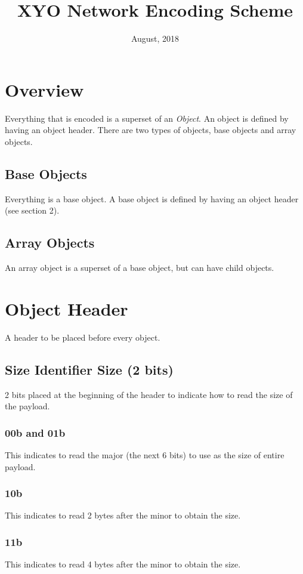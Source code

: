 \documentclass[11pt]{article}
\title{XYO Network Encoding Scheme}
\date{August, 2018}
\begin{document}
\maketitle


\section{Overview}
Everything that is encoded is a superset of an \textit{Object}. An object is defined by having an object header. There are two types of objects, base objects and array objects.

\subsection{Base Objects}
Everything is a base object. A base object is defined by having an object header (see section 2).

\subsection{Array Objects}
An array object is a superset of a base object, but can have child objects. 

\section{Object Header}
A header to be placed before every object.

\subsection{Size Identifier Size (2 bits)}
2 bits placed at the beginning of the header to indicate how to read the size of the payload.

\subsubsection{00b and 01b}
This indicates to read the major (the next 6 bits) to use as the size of entire payload. 

\subsubsection{10b}
This indicates to read 2 bytes after the minor to obtain the size. 


\subsubsection{11b}
This indicates to read 4 bytes after the minor to obtain the size. 
\end{document}
